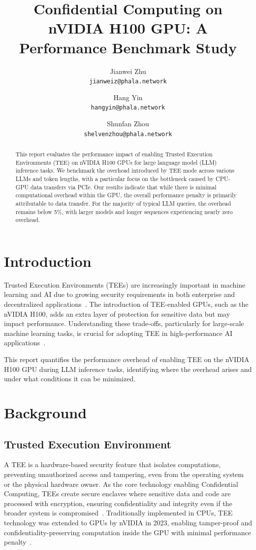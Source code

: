 \documentclass{article}
\title{Confidential Computing on nVIDIA H100 GPU: A Performance Benchmark Study}
\author{
  Jianwei Zhu \\
  \texttt{jianweiz@phala.network}
  \and
  Hang Yin \\
  \texttt{hangyin@phala.network}
  \and
  Shunfan Zhou \\
  \texttt{shelvenzhou@phala.network}
}
\begin{document}
\maketitle

\begin{abstract}
    This report evaluates the performance impact of enabling Trusted Execution Environments (TEE) on nVIDIA H100 GPUs for large language model (LLM) inference tasks. We benchmark the overhead introduced by TEE mode across various LLMs and token lengths, with a particular focus on the bottleneck caused by CPU-GPU data transfers via PCIe. Our results indicate that while there is minimal computational overhead within the GPU, the overall performance penalty is primarily attributable to data transfer. For the majority of typical LLM queries, the overhead remains below 5\%, with larger models and longer sequences experiencing nearly zero overhead.
\end{abstract}

\section{Introduction}

Trusted Execution Environments (TEEs) are increasingly important in machine learning and AI due to growing security requirements in both enterprise and decentralized applications~\cite{sabt2015trusted, matetic2018delegatee, ayoade2018decentralized}. The introduction of TEE-enabled GPUs, such as the nVIDIA H100, adds an extra layer of protection for sensitive data but may impact performance. Understanding these trade-offs, particularly for large-scale machine learning tasks, is crucial for adopting TEE in high-performance AI applications~\cite{yudha2022lite, wang2024confidential}.

This report quantifies the performance overhead of enabling TEE on the nVIDIA H100 GPU during LLM inference tasks, identifying where the overhead arises and under what conditions it can be minimized.

\section{Background}

\subsection{Trusted Execution Environment}

A TEE is a hardware-based security feature that isolates computations, preventing unauthorized access and tampering, even from the operating system or the physical hardware owner. As the core technology enabling Confidential Computing, TEEs create secure enclaves where sensitive data and code are processed with encryption, ensuring confidentiality and integrity even if the broader system is compromised~\cite{sabt2015trusted}. Traditionally implemented in CPUs, TEE technology was extended to GPUs by nVIDIA in 2023, enabling tamper-proof and confidentiality-preserving computation inside the GPU with minimal performance penalty~\cite{dhanuskodi2023creating}.
\end{document}
